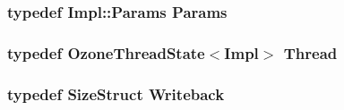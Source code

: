 \hypertarget{classBackEnd_a818e103eae798a24a06a0a34631849ea}{
\subsubsection[{Params}]{\setlength{\rightskip}{0pt plus 5cm}typedef Impl::Params {\bf Params}}}
\label{classBackEnd_a818e103eae798a24a06a0a34631849ea}
\hypertarget{classBackEnd_a9311aca87e8229ec3f7a7422ccbc9fbe}{
\subsubsection[{Thread}]{\setlength{\rightskip}{0pt plus 5cm}typedef {\bf OzoneThreadState}$<$Impl$>$ {\bf Thread}}}
\label{classBackEnd_a9311aca87e8229ec3f7a7422ccbc9fbe}
\hypertarget{classBackEnd_a20d1fb15b536d49c687dee42d95c1a87}{
\subsubsection[{Writeback}]{\setlength{\rightskip}{0pt plus 5cm}typedef {\bf SizeStruct} {\bf Writeback}}}
\label{classBackEnd_a20d1fb15b536d49c687dee42d95c1a87}


